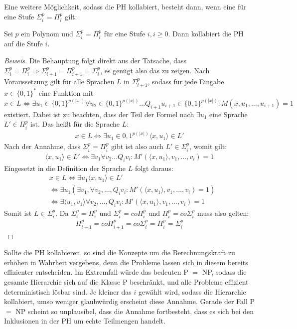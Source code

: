 Eine weitere Möglichkeit, sodass die PH kollabiert, besteht dann, wenn eine für eine Stufe $\Sigma^p_i = \Pi^p_i$ gilt:

\begin{theorem}
    Sei $p$ ein Polynom und $\Sigma^p_i = \Pi^p_i$ für eine Stufe $i, i \geq 0$. Dann kollabiert die PH auf die Stufe $i$.
\end{theorem}

\begin{proof}[Beweis]
    Die Behauptung folgt direkt aus der Tatsache, dass $\Sigma^p_i = \Pi^p_i \Rightarrow \Sigma^p_{i+1} = \Pi^p_{i+1} = \Sigma^p_i$, es genügt also das zu zeigen.
    Nach Voraussetzung gilt für alle Sprachen $L$ in $\Sigma^p_{i+1}$, sodass für jede Eingabe $x \in \{0,1\}^*$ eine Funktion mit 
    $$
    x \in L \Leftrightarrow \exists u_1 \in \{0,1\}^{p(|x|)} \forall u_2 \in \{0,1\}^{p(|x|)} ... Q_{i+1}u_{i + 1} \in \{0,1\}^{p(|x|)} : M(x, u_1, ..., u_{i+1}) = 1
    $$
    existiert.
    Dabei ist zu beachten, dass der Teil der Formel nach $\exists u_1$ eine Sprache $L' \in \Pi^p_i$ ist.
    Das heißt für die Sprache $L$:
    \begin{align*}
    x \in L \Leftrightarrow \exists u_1 \in {0,1}^{p(|x|)} \langle x, u_1 \rangle \in L'
    \end{align*}
    Nach der Annahme, dass  $\Sigma^p_i = \Pi^p_i$ gibt ist also auch $L' \in \Sigma^p_i$, womit gilt:
    \begin{align*}
    \langle x, u_1 \rangle \in L' \Leftrightarrow \exists v_1 \forall v_2 ... Q_i v_i : M'(\langle x, u_1 \rangle, v_1, ..., v_i) = 1 
    \end{align*}
    Eingesetzt in die Definition der Sprache $L$ folgt daraus:
    \begin{align*}
    & x \in L \Leftrightarrow \exists u_1 \langle x, u_1 \rangle \in L' \\
    & \Leftrightarrow \exists u_1 (\exists v_1, \forall v_2, ..., Q_i v_i :  M'(\langle x, u_1 \rangle, v_1, ..., v_i) = 1) \\
    & \Leftrightarrow \exists \langle u_1, v_1 \rangle \forall v_2, ..., Q_i v_i : M'(\langle x, u_1 \rangle, v_1, ..., v_i) = 1
    \end{align*}
    Somit ist $L \in \Sigma^p_i$. Da $\Sigma^p_i = \Pi^p_i$ und $\Sigma^p_i = co\Pi^p_i$ und $\Pi^p_i = co\Sigma^p_i$ muss also gelten:
    \begin{align*}
    \Pi^p_{i+1} = co\Pi^p_{i+1} = co\Sigma^p_i = \Pi^p_i = \Sigma^p_i
    \end{align*}
\end{proof}

Sollte die PH kollabieren, so sind die Konzepte um die Berechnungskraft zu erhöhen in Wahrheit vergebens, denn die Probleme lassen sich in diesem bereits effizienter entscheiden.
Im Extremfall würde das bedeuten P $=$ NP, sodass die gesamte Hierarchie sich auf die Klasse P beschränkt, und alle Probleme effizient deterministisch lösbar sind.
Je kleiner das $i$ gewählt wird, sodass die Hierarchie kollabiert, umso weniger glaubwürdig erscheint diese Annahme.
Gerade der Fall P $=$ NP scheint so unplausibel, dass die Annahme fortbesteht, dass es sich bei den Inklusionen in der PH um echte Teilmengen handelt.
